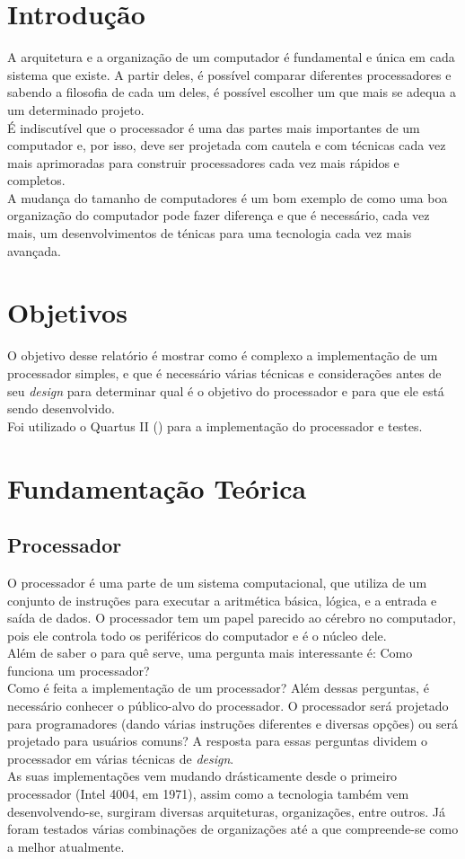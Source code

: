 \documentclass[a4paper, 12pt]{article}
\begin{document}
\section{Introdução}
A arquitetura e a organização de um computador é fundamental e única em cada sistema que existe. A partir deles, é possível comparar diferentes processadores e sabendo a filosofia de cada um deles, é possível escolher um que mais se adequa a um determinado projeto.\\
É indiscutível que o processador é uma das partes mais importantes de um computador e, por isso, deve ser projetada com cautela e com técnicas cada vez mais aprimoradas para construir processadores cada vez mais rápidos e completos.\\
A mudança do tamanho de computadores é um bom exemplo de como uma boa organização do computador pode fazer diferença e que é necessário, cada vez mais, um desenvolvimentos de ténicas para uma tecnologia cada vez mais avançada.

\section{Objetivos}
O objetivo desse relatório é mostrar como é complexo a implementação de um processador simples, e que é necessário várias técnicas e considerações antes de seu \textit{design} para determinar qual é o objetivo do processador e para que ele está sendo desenvolvido.\\
Foi utilizado o Quartus II (\cite{quartus}) para a implementação do processador e testes.
\newpage

\section{Fundamentação Teórica}
\subsection{Processador}
O processador é uma parte de um sistema computacional, que utiliza de um conjunto de instruções para executar a aritmética básica, lógica, e a entrada e saída de dados. O processador tem um papel parecido ao cérebro no computador, pois ele controla todo os periféricos do computador e é o núcleo dele.\\
Além de saber o para quê serve, uma pergunta mais interessante é: Como funciona um processador?\\
Como é feita a implementação de um processador? Além dessas perguntas, é necessário conhecer o público-alvo do processador. O processador será projetado para programadores (dando várias instruções diferentes e diversas opções) ou será projetado para usuários comuns?
A resposta para essas perguntas dividem o processador em várias técnicas de \textit{design}.\\
As suas implementações vem mudando drásticamente desde o primeiro processador (Intel 4004, em 1971), assim como a tecnologia também vem desenvolvendo-se, surgiram diversas arquiteturas, organizações, entre outros. Já foram testados várias combinações de organizações até a que compreende-se como a melhor atualmente.
\end{document}
